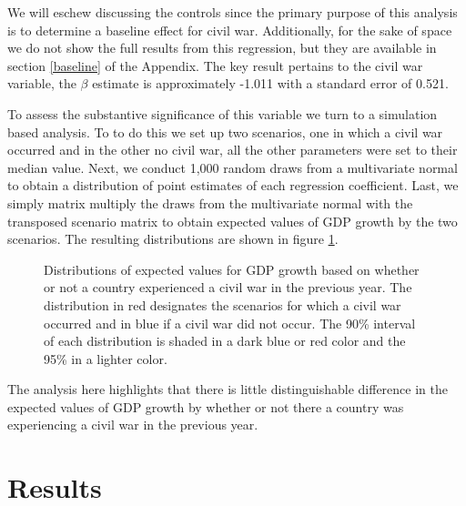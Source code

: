 
We will eschew discussing the controls since the primary purpose of this analysis is to determine a baseline effect for civil war. Additionally, for the sake of space we do not show the full results from this regression, but they are available in section \ref{baseline} of the Appendix. The key result pertains to the civil war variable, the $\beta$ estimate is approximately -1.011 with a standard error of 0.521. 

To assess the substantive significance of this variable we turn to a simulation based analysis. To to do this we set up two scenarios, one in which a civil war occurred and in the other no civil war, all the other parameters were set to their median value. Next, we conduct 1,000 random draws from a multivariate normal to obtain a distribution of point estimates of each regression coefficient. Last, we simply matrix multiply the draws from the multivariate normal with the transposed scenario matrix to obtain expected values of GDP growth by the two scenarios. The resulting distributions are shown in figure \ref{fig:civWarEffect}. 

\begin{figure}
	\centering
	\resizebox{.45\textwidth}{!}{}
	\caption{Distributions of expected values for GDP growth based on whether or not a country experienced a civil war in the previous year. The distribution in red designates the scenarios for which a civil war occurred and in blue if a civil war did not occur. The 90\% interval of each distribution is shaded in a dark blue or red color and the 95\% in a lighter color.}
	\label{fig:civWarEffect}	
\end{figure}

The analysis here highlights that there is little distinguishable difference in the expected values of GDP growth by whether or not there a country was experiencing a civil war in the previous year. 

\section{Results}
\label{findings} 

